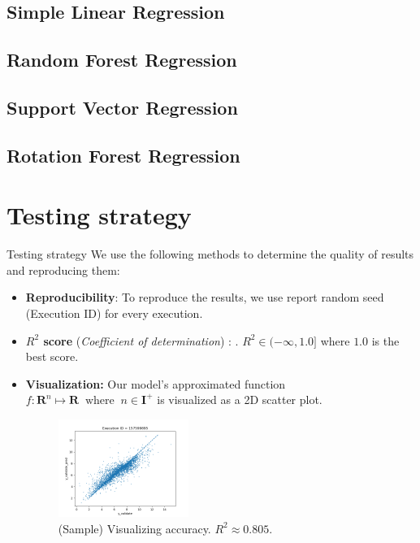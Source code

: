 \documentclass{beamer}
\begin{document}
\subsection{Simple Linear Regression}
\subsection{Random Forest Regression}
\subsection{Support Vector Regression}
\subsection{Rotation Forest Regression}

\section{Testing strategy}

\begin{frame}[t]{Testing strategy}
We use the following methods to determine the quality of results and reproducing them:
\begin{itemize}
\item \textbf{Reproducibility}: To reproduce the results, we use report random seed (Execution ID) for every execution. 
\item \textbf{$R^2$ score} (\textit{Coefficient of determination}) \cite{r_squared_score}: . $R^2  \in (- \infty, 1.0]$ where $1.0$ is the best score. 
\item \textbf{Visualization:}
Our model's approximated function $ f : \mathbf{R}^n \mapsto \mathbf{R} \;\; \textrm{where} \;\; n \in \mathbf{I}^+$ is visualized as a 2D scatter plot.

\begin{figure}[htb]
  \centering
    \includegraphics[width=0.40\textwidth]{images/accuracy_validate}
    \caption{(Sample) Visualizing accuracy.  $R^2 \approx 0.805$.}
    \label{fig:modelQualityVisualization}
\end{figure}

\end{itemize} 
\end{frame}
\end{document}
